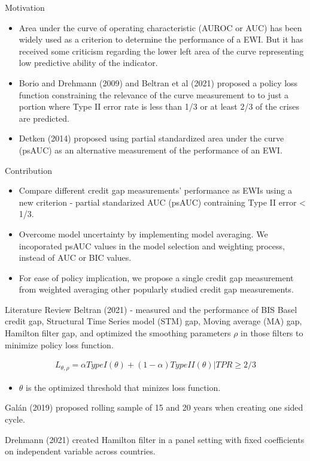 \documentclass[
  ignorenonframetext,
]{beamer}
\providecommand{\tightlist}{%
  \setlength{\itemsep}{0pt}\setlength{\parskip}{0pt}}
\begin{document}
\begin{frame}{Motivation}
\protect\hypertarget{motivation-1}{}
\begin{itemize}
\tightlist
\item
  Area under the curve of operating characteristic (AUROC or AUC) has
  been widely used as a criterion to determine the performance of a EWI.
  But it has received some criticism regarding the lower left area of
  the curve representing low predictive ability of the indicator.
\item
  Borio and Drehmann (2009) and Beltran et al (2021) proposed a policy
  loss function constraining the relevance of the curve measurement to
  to just a portion where Type II error rate is less than 1/3 or at
  least 2/3 of the crises are predicted.\\
\item
  Detken (2014) proposed using partial standardized area under the curve
  (psAUC) as an alternative measurement of the performance of an EWI.
\end{itemize}
\end{frame}

\begin{frame}{Contribution}
\protect\hypertarget{contribution}{}
\begin{itemize}
\tightlist
\item
  Compare different credit gap measurements' performance as EWIs using a
  new criterion - partial standarized AUC (psAUC) contraining Type II
  error \textless{} 1/3.
\item
  Overcome model uncertainty by implementing model averaging. We
  incoporated psAUC values in the model selection and weighting process,
  instead of AUC or BIC values.
\item
  For ease of policy implication, we propose a single credit gap
  measurement from weighted averaging other popularly studied credit gap
  measurements.
\end{itemize}
\end{frame}

\begin{frame}{Literature Review}
\protect\hypertarget{literature-review}{}
Beltran (2021) - measured and the performance of BIS Basel credit gap,
Structural Time Series model (STM) gap, Moving average (MA) gap,
Hamilton filter gap, and optimized the smoothing parameters \(\rho\) in
those filters to minimize policy loss function.

\begin{align*}
L_{\theta,\rho}=\alpha TypeI(\theta)+(1-\alpha)TypeII(\theta)|TPR\ge2/3
\end{align*}

\begin{itemize}
\tightlist
\item
  \(\theta\) is the optimized threshold that minizes loss function.
\end{itemize}

Galán (2019) proposed rolling sample of 15 and 20 years when creating
one sided cycle.

Drehmann (2021) created Hamilton filter in a panel setting with fixed
coefficients on independent variable across countries.
\end{frame}
\end{document}
